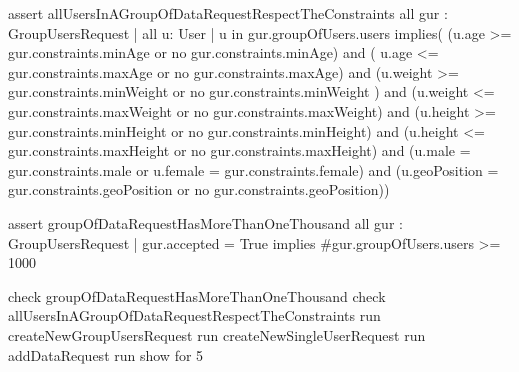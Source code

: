 assert allUsersInAGroupOfDataRequestRespectTheConstraints{
	all gur : GroupUsersRequest | all u: User | u in gur.groupOfUsers.users implies( 
	(u.age >= gur.constraints.minAge or no gur.constraints.minAge) and ( u.age <= gur.constraints.maxAge
	or no gur.constraints.maxAge) and (u.weight >= gur.constraints.minWeight or no gur.constraints.minWeight )  and 
	(u.weight <= gur.constraints.maxWeight or no gur.constraints.maxWeight) and (u.height >= gur.constraints.minHeight 
	or no gur.constraints.minHeight) and (u.height <= gur.constraints.maxHeight or no  gur.constraints.maxHeight)  and
	(u.male = gur.constraints.male or u.female = gur.constraints.female) and (u.geoPosition = gur.constraints.geoPosition
	or no  gur.constraints.geoPosition))
}

assert groupOfDataRequestHasMoreThanOneThousand{
	all gur : GroupUsersRequest | gur.accepted = True implies #gur.groupOfUsers.users >= 1000
}

check  groupOfDataRequestHasMoreThanOneThousand
check allUsersInAGroupOfDataRequestRespectTheConstraints
run createNewGroupUsersRequest
run createNewSingleUserRequest
run addDataRequest
run show for 5


